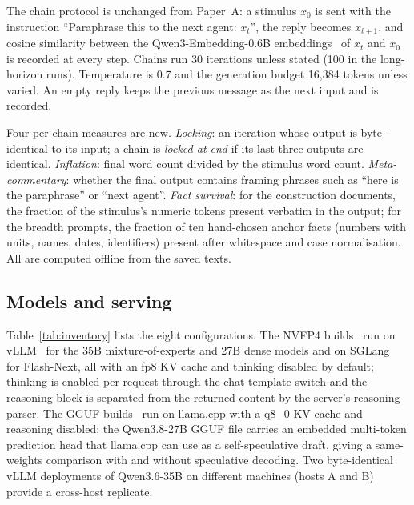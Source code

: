 \documentclass[11pt]{article}
\begin{document}
The chain protocol is unchanged from Paper~A: a stimulus $x_0$ is sent with
the instruction ``Paraphrase this to the next agent: $x_t$'', the reply
becomes $x_{t+1}$, and cosine similarity between the Qwen3-Embedding-0.6B
embeddings~\citep{zhang2025qwen3embedding} of $x_t$ and $x_0$ is recorded
at every step. Chains run 30 iterations unless stated (100 in the
long-horizon runs). Temperature is 0.7 and the generation budget 16{,}384
tokens unless varied. An empty reply keeps the previous message as the next
input and is recorded.

Four per-chain measures are new. \emph{Locking}: an iteration whose output
is byte-identical to its input; a chain is \emph{locked at end} if its last
three outputs are identical. \emph{Inflation}: final word count divided by
the stimulus word count. \emph{Meta-commentary}: whether the final output
contains framing phrases such as ``here is the paraphrase'' or ``next
agent''. \emph{Fact survival}: for the construction documents, the fraction
of the stimulus's numeric tokens present verbatim in the output; for the
breadth prompts, the fraction of ten hand-chosen anchor facts (numbers with
units, names, dates, identifiers) present after whitespace and case
normalisation. All are computed offline from the saved texts.

\subsection{Models and serving}
\label{sec:models}

Table~\ref{tab:inventory} lists the eight configurations. The NVFP4
builds~\citep{nvidia2025nvfp4,nvidia2026qwen36nvfp4} run on
vLLM~\citep{kwon2023vllm} for the 35B mixture-of-experts and 27B dense
models and on SGLang~\citep{zheng2024sglang} for Flash-Next, all with an
fp8 KV cache and thinking disabled by default; thinking is enabled per
request through the chat-template switch and the reasoning block is
separated from the returned content by the server's reasoning parser. The
GGUF builds~\citep{gerganov_llamacpp,unsloth2026qwen36gguf,
unsloth2026qwen38gguf} run on llama.cpp with a q8\_0 KV cache and reasoning
disabled; the Qwen3.8-27B GGUF file carries an embedded multi-token
prediction head that llama.cpp can use as a self-speculative draft, giving a
same-weights comparison with and without speculative decoding. Two
byte-identical vLLM deployments of Qwen3.6-35B on different machines (hosts
A and B) provide a cross-host replicate.
\end{document}
